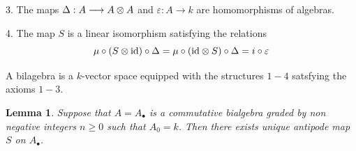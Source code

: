 \documentclass[10pt]{article}
\newtheorem{lemma}[theorem]{Lemma}
\begin{document}
3. The maps $\Delta: A \longrightarrow A \otimes A$ and $\varepsilon: A \to k$ 
are homomorphisms of algebras.

4. The map $S$ is a linear isomorphism satisfying the relations
\begin{equation} \label{4.16.01.1}
\mu \circ (S \otimes {\rm id}) \circ \Delta  = \mu \circ ({\rm id} \otimes S) 
\circ \Delta  = i \circ \varepsilon
\end{equation}


A bilagebra is a $k$-vector space equipped with the structures $1-4$ satsfying the axioms
$1-3$. 

\begin{lemma} \label{4.15.01.1}
Suppose that $A = A_{\bullet}$ is a commutative bialgebra 
graded by non negative integers $n \geq 0$ such that 
$A_0 =k$. Then there exists unique 
antipode map $S$ on $A_{\bullet}$. 
\end{lemma}
 
\end{document}

